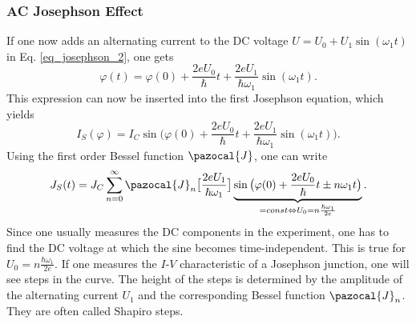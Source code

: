 \documentclass[a4paper,10pt]{article}
\begin{document}
\subsubsection*{AC Josephson Effect} %
If one now adds an alternating current to the DC voltage $U = U_0 + U_1 \sin(\omega_1 t)$ in Eq. \ref{eq_josephson_2}, one gets 
\begin{equation}
    \varphi(t) = \varphi(0) + \frac{2 e U_0}{\hbar} t + \frac{2 e U_1}{\hbar \omega_1} \sin(\omega_1 t).
\end{equation}
This expression can now be inserted into the first Josephson equation, which yields 
\begin{equation}
    I_S(\varphi) = I_C \sin \big( \varphi(0) + \frac{2 e U_0}{\hbar} t + \frac{2 e U_1}{\hbar \omega_1} \sin(\omega_1 t) \big). 
\end{equation}
Using the first order Bessel function $\pazocal{J}$, one can write
\begin{equation}
    J_S(t) = J_C \sum^{\infty}_{n = 0} \pazocal{J}_n \big[ \frac{2 e U_1}{\hbar \omega_1} \big] \underbrace{\sin \big( \varphi(0) + \frac{2 e U_0}{\hbar} t \pm n \omega_1 t \big)}_{= const \Leftrightarrow U_0 = n \frac{\hbar \omega_1}{2e}}.
\end{equation}
Since one usually measures the DC components in the experiment, one has to find the DC voltage at which the sine becomes time-independent. This is true for $U_0 = n \frac{\hbar \omega_1}{2e}$. If one measures the $I$-$V$ characteristic of a Josephson junction, one will see steps in the curve. The height of the steps is determined by the amplitude of the alternating current $U_1$ and the corresponding Bessel function $\pazocal{J}_n$. They are often called Shapiro steps.
\end{document}
